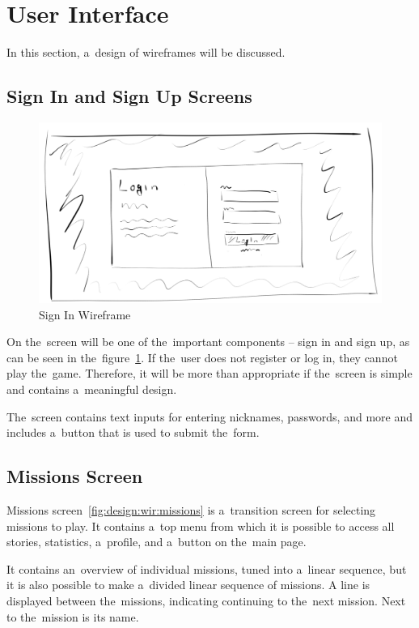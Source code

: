 \section{User Interface}
\label{design:ui}

In this section, a~design of wireframes will be discussed.

\subsection{Sign In and Sign Up Screens}

\begin{figure}
    \centering
    \includegraphics[width=1\linewidth]{assets/design/ui/wir_login.png}
    \caption{Sign In Wireframe}
    \label{fig:design:wir:login}
\end{figure}

On the~screen will be one of the~important components -- sign in and sign up, as can be seen in the~figure~\ref{fig:design:wir:login}.
If the~user does not register or log in, they cannot play the~game.
Therefore, it will be more than appropriate if the~screen is simple and contains a~meaningful design.

The~screen contains text inputs for entering nicknames, passwords, and more and includes a~button that is used to submit the~form.

\subsection{Missions Screen}

Missions screen~\ref{fig:design:wir:missions} is a~transition screen for selecting missions to play.
It contains a~top menu from which it is possible to access all stories, statistics, a~profile, and a~button on the~main page.

It contains an~overview of individual missions, tuned into a~linear sequence, but it is also possible to make a~divided linear sequence of missions.
A line is displayed between the~missions, indicating continuing to the~next mission.
Next to the~mission is its name.

